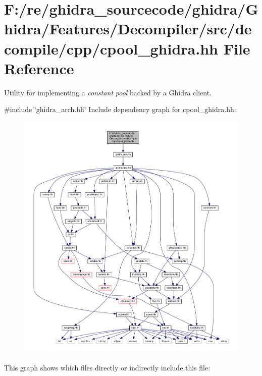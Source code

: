 \hypertarget{cpool__ghidra_8hh}{}\section{F\+:/re/ghidra\+\_\+sourcecode/ghidra/\+Ghidra/\+Features/\+Decompiler/src/decompile/cpp/cpool\+\_\+ghidra.hh File Reference}
\label{cpool__ghidra_8hh}


Utility for implementing a {\itshape constant} {\itshape pool} backed by a Ghidra client.  


{\ttfamily \#include \char`\"{}ghidra\+\_\+arch.\+hh\char`\"{}}\newline
Include dependency graph for cpool\+\_\+ghidra.\+hh\+:
\nopagebreak
\begin{figure}[H]
\begin{center}
\leavevmode
\includegraphics[width=350pt]{cpool__ghidra_8hh__incl}
\end{center}
\end{figure}
This graph shows which files directly or indirectly include this file\+:
\nopagebreak
